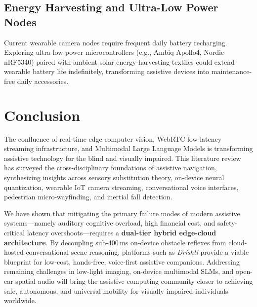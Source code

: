\documentclass[10pt,twocolumn]{article}
\begin{document}
\subsection{Energy Harvesting and Ultra-Low Power Nodes}
Current wearable camera nodes require frequent daily battery recharging. Exploring ultra-low-power microcontrollers (e.g., Ambiq Apollo4, Nordic nRF5340) paired with ambient solar energy-harvesting textiles could extend wearable battery life indefinitely, transforming assistive devices into maintenance-free daily accessories.

\section{Conclusion}
\label{sec:conclusion}
The confluence of real-time edge computer vision, WebRTC low-latency streaming infrastructure, and Multimodal Large Language Models is transforming assistive technology for the blind and visually impaired. This literature review has surveyed the cross-disciplinary foundations of assistive navigation, synthesizing insights across sensory substitution theory, on-device neural quantization, wearable IoT camera streaming, conversational voice interfaces, pedestrian micro-wayfinding, and inertial fall detection. 

We have shown that mitigating the primary failure modes of modern assistive systems---namely auditory cognitive overload, high financial cost, and safety-critical latency overshoots---requires a \textbf{dual-tier hybrid edge-cloud architecture}. By decoupling sub-400\,ms on-device obstacle reflexes from cloud-hosted conversational scene reasoning, platforms such as \textit{Drishti} provide a viable blueprint for low-cost, hands-free, voice-first assistive companions. Addressing remaining challenges in low-light imaging, on-device multimodal SLMs, and open-ear spatial audio will bring the assistive computing community closer to achieving safe, autonomous, and universal mobility for visually impaired individuals worldwide.
\end{document}
